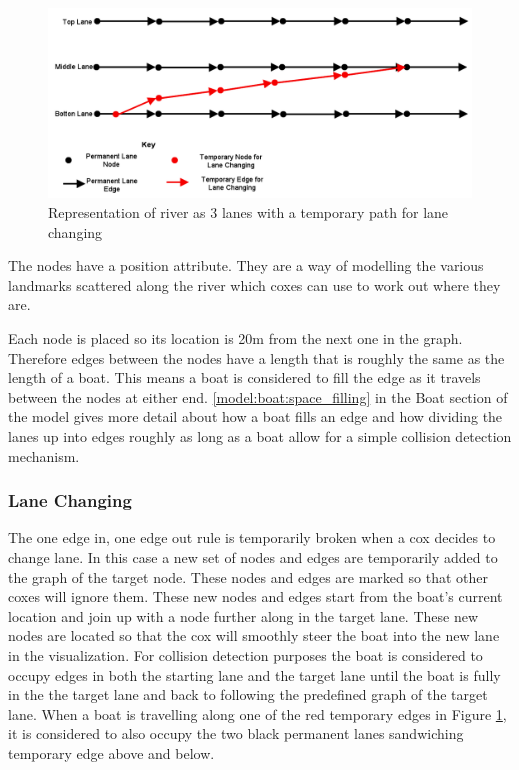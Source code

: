       \begin{figure}
      \begin{center}
      	\includegraphics[scale=0.5,angle=90]{images/lanes.png}
      	\caption{Representation of river as 3 lanes with a temporary path for lane changing}
      	\label{fig:model:lanes}
      \end{center}
      \end{figure}
      
      The nodes have a position attribute. They are a way of modelling the various landmarks scattered along the river which coxes can use to work out where they are.
      
      Each node is placed so its location is 20m from the next one in the graph. Therefore edges between the nodes have a length that is roughly the same as the length of a boat. This means a boat is considered to fill the edge as it travels between the nodes at either end. \ref{model:boat:space_filling} in the Boat section of the model  gives more detail about how a boat fills an edge and how dividing the lanes up into edges roughly as long as a boat allow for a simple collision detection mechanism.
      
      \subsubsection{Lane Changing} \label{model:river:lane_changing}
      The one edge in, one edge out rule is temporarily broken when a cox decides to change lane. In this case a new set of nodes and edges are temporarily added to the graph of the target node. These nodes and edges are marked so that other coxes will ignore them. These new nodes and edges start from the boat's current location and join up with a node further along in the target lane. These new nodes are located so that the cox will smoothly steer the boat into the new lane in the visualization. For collision detection purposes the boat is considered to occupy edges in both the starting lane and the target lane until the boat is fully in the the target lane and back to following the predefined graph of the target lane. When a boat is travelling along one of the red temporary edges in Figure \ref{fig:model:lanes}, it is considered to also occupy the two black permanent lanes sandwiching temporary edge above and below.


